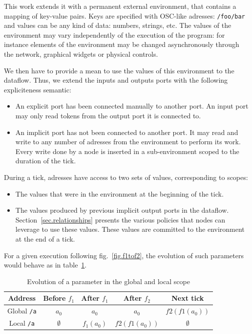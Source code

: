 \documentclass{article}
\begin{document}
This work extends it with a permanent external environment, that contains a mapping of key-value pairs.
Keys are specified with OSC-like\cite{Freed09featuresand} adresses: \lstinline|/foo/bar| and values can be any kind of data: numbers, strings, etc. 
The values of the environment may vary independently of the execution of the program: for instance elements of the environment may be changed asynchronously through the network, graphical widgets or physical controls.
    
We then have to provide a mean to use the values of this environment to the dataflow.
Thus, we extend the inputs and outputs ports with the following expliciteness semantic: 
    
\begin{itemize}
  \item An explicit port has been connected manually to another port.
        An input port may only read tokens from the output port it is connected to.
        	      
  \item An implicit port has not been connected to another port. 
        It may read and write to any number of adresses from the environment to perform its work.
        Every write done by a node is inserted in a sub-environment scoped to the duration of the tick.
\end{itemize}
    
During a tick, adresses have access to two sets of values, corresponding to scopes: 
\begin{itemize}
  \item The values that were in the environment at the beginning of the tick.
  \item The values produced by previous implicit output ports in the dataflow.
        Section~\ref{sec.relationships} presents the various policies that nodes can leverage to 
        use these values. 
        These values are committed to the environment at the end of a tick.
\end{itemize}

For a given execution following fig.~\ref{fig.f1tof2}, the evolution of such parameters would behave as in table~\ref{tbl.evolution}.

\begin{table}[h]
	\centering
	\footnotesize
	\begin{tabular}{c|cccc}
		Address & Before $f_1$ & After $f_1$ & After $f_2$ & Next tick \\
		\midrule
		Global \lstinline|/a|  & $a_0$ & $a_0$ & $a_0$ & $f2(f1(a_0))$\\
		Local \lstinline|/a|   & $\emptyset$ & $f_1(a_0)$ & $f2(f1(a_0))$ & $\emptyset$ \\	
	\end{tabular}
	\caption{Evolution of a parameter in the global and local scope}
	\label{tbl.evolution}
\end{table}
\end{document}
